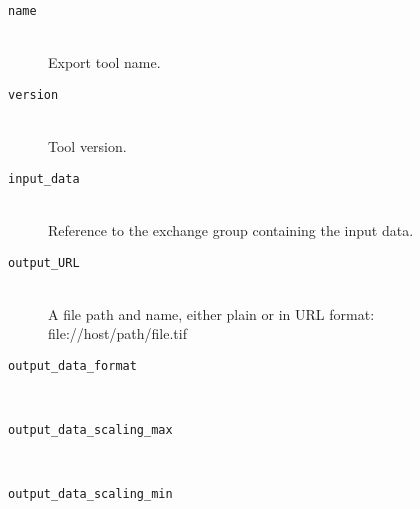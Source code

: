 \begin{description}
\item[\tt{name}] \hfill \\
{Export tool name.}

\item[\tt{version}] \hfill \\
{Tool version.}

\item[\tt{input\_data}] \hfill \\
{Reference to the exchange group containing the input data.}

\item[\tt{output\_URL}] \hfill \\
{A file path and name, either plain or in URL format: file://host/path/file.tif }

\item[\tt{output\_data\_format}] \hfill \\
{}

\item[\tt{output\_data\_scaling\_max}] \hfill \\
{}

\item[\tt{output\_data\_scaling\_min}] \hfill \\
{}
\end{description}

